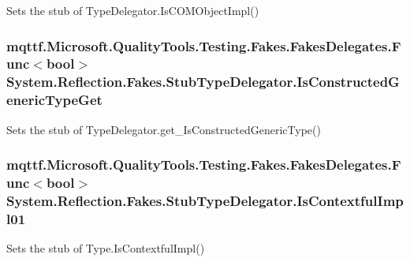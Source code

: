 Sets the stub of Type\-Delegator.\-Is\-C\-O\-M\-Object\-Impl()

\hypertarget{class_system_1_1_reflection_1_1_fakes_1_1_stub_type_delegator_a4db81672b592704f95b71ca49240c680}{
\subsubsection[{Is\-Constructed\-Generic\-Type\-Get}]{\setlength{\rightskip}{0pt plus 5cm}mqttf.\-Microsoft.\-Quality\-Tools.\-Testing.\-Fakes.\-Fakes\-Delegates.\-Func$<$bool$>$ System.\-Reflection.\-Fakes.\-Stub\-Type\-Delegator.\-Is\-Constructed\-Generic\-Type\-Get}}\label{class_system_1_1_reflection_1_1_fakes_1_1_stub_type_delegator_a4db81672b592704f95b71ca49240c680}


Sets the stub of Type\-Delegator.\-get\-\_\-\-Is\-Constructed\-Generic\-Type()

\hypertarget{class_system_1_1_reflection_1_1_fakes_1_1_stub_type_delegator_a155500e1b22115513165714d4c2f1052}{
\subsubsection[{Is\-Contextful\-Impl01}]{\setlength{\rightskip}{0pt plus 5cm}mqttf.\-Microsoft.\-Quality\-Tools.\-Testing.\-Fakes.\-Fakes\-Delegates.\-Func$<$bool$>$ System.\-Reflection.\-Fakes.\-Stub\-Type\-Delegator.\-Is\-Contextful\-Impl01}}\label{class_system_1_1_reflection_1_1_fakes_1_1_stub_type_delegator_a155500e1b22115513165714d4c2f1052}


Sets the stub of Type.\-Is\-Contextful\-Impl()

